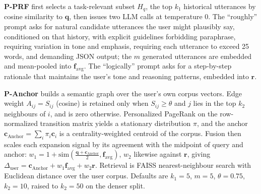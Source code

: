 \textbf{P-PRF} first selects a task-relevant subset $H_q$, the top $k_1$ historical utterances by cosine similarity to $\mathbf{q}$, then issues two LLM calls at temperature 0. The ``roughly'' prompt asks for natural candidate utterances the user might plausibly say, conditioned on that history, with explicit guidelines forbidding paraphrase, requiring variation in tone and emphasis, requiring each utterance to exceed 25 words, and demanding JSON output; the $m$ generated utterances are embedded and mean-pooled into $\mathbf{f}_{\mathrm{avg}}$. The ``logically'' prompt asks for a step-by-step rationale that maintains the user's tone and reasoning patterns, embedded into $\mathbf{r}$.

\textbf{P-Anchor} builds a semantic graph over the user's own corpus vectors. Edge weight $A_{ij}=S_{ij}$ (cosine) is retained only when $S_{ij}\geq\theta$ and $j$ lies in the top $k_2$ neighbours of $i$, and is zero otherwise. Personalized PageRank on the row-normalized transition matrix yields a stationary distribution $\pi$, and the anchor $\mathbf{c}_{\mathrm{Anchor}}=\sum_i \pi_i\mathbf{c}_i$ is a centrality-weighted centroid of the corpus. Fusion then scales each expansion signal by its agreement with the midpoint of query and anchor: $w_1=1+\mathrm{sim}(\tfrac{\mathbf{q}+\mathbf{c}_{\mathrm{Anchor}}}{2},\mathbf{f}_{\mathrm{avg}})$, $w_2$ likewise against $\mathbf{r}$, giving $\Delta_{\mathrm{user}}=\mathbf{c}_{\mathrm{Anchor}}+w_1\mathbf{f}_{\mathrm{avg}}+w_2\mathbf{r}$. Retrieval is FAISS nearest-neighbour search with Euclidean distance over the user corpus. Defaults are $k_1=5$, $m=5$, $\theta=0.75$, $k_2=10$, raised to $k_2=50$ on the denser split.

\begin{center}
\end{center}

